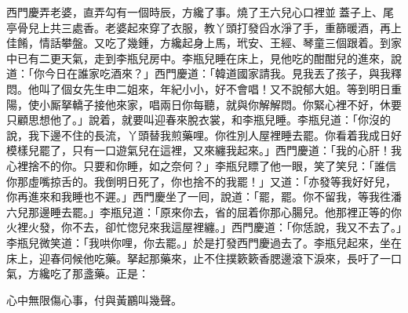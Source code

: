 西門慶弄老婆，直弄勾有一個時辰，方纔了事。燒了王六兒心口裡並𣬼蓋子上、尾亭骨兒上共三處香。老婆起來穿了衣服，教丫頭打發舀水淨了手，重篩暖酒，再上佳餚，情話攀盤。又吃了幾鍾，方纔起身上馬，玳安、王經、琴童三個跟着。到家中已有二更天氣，走到李瓶兒房中。李瓶兒睡在床上，見他吃的酣酣兒的進來，說道：「你今日在誰家吃酒來？」西門慶道：「韓道國家請我。見我丟了孩子，與我釋悶。他叫了個女先生申二姐來，年紀小小，好不會唱！又不說郁大姐。等到明日重陽，使小厮拏轎子接他來家，唱兩日你每聽，就與你解解悶。你緊心裡不好，休要只顧思想他了。」{}說着，就要叫迎春來脫衣裳，和李瓶兒睡。李瓶兒道：「你沒的說，我下邊不住的長流，丫頭替我煎藥哩。你徃別人屋裡睡去罷。你看着我成日好模樣兒罷了，只有一口遊氣兒在這裡，又來纏我起來。」西門慶道：「我的心肝！我心裡捨不的你。只要和你睡，如之奈何？」李瓶兒瞟了他一眼，笑了笑兒：「誰信你那虛嘴掠舌的。我倒明日死了，你也捨不的我罷！」又道：「亦發等我好好兒，你再進來和我睡也不遲。」西門慶坐了一囘，說道：「罷，罷。你不留我，等我徃潘六兒那邊睡去罷。」李瓶兒道：「原來你去，省的屈着你那心腸兒。他那裡正等的你火裡火發，你不去，卻忙惚兒來我這屋裡纏。」{}西門慶道：「你恁說，我又不去了。」李瓶兒微笑道：「我哄你哩，你去罷。」於是打發西門慶過去了。李瓶兒起來，坐在床上，迎春伺候他吃藥。拏起那藥來，止不住撲簌簌香腮邊滾下淚來，長吁了一口氣，{}方纔吃了那盞藥。正是：

\begin{myquote}
心中無限傷心事，付與黃鸝叫幾聲。
\end{myquote}

